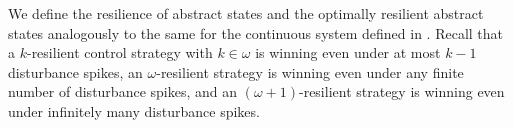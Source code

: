 We define the resilience of abstract states and the optimally resilient abstract states analogously to the same for the continuous system defined in .
Recall that a $k$-resilient control strategy with $k \in \omega$ is winning even under at most $k-1$ disturbance spikes, an $\omega$-resilient strategy is winning even under any finite number of disturbance spikes, and an $(\omega + 1)$-resilient strategy is winning even under infinitely many disturbance spikes.
%
%

